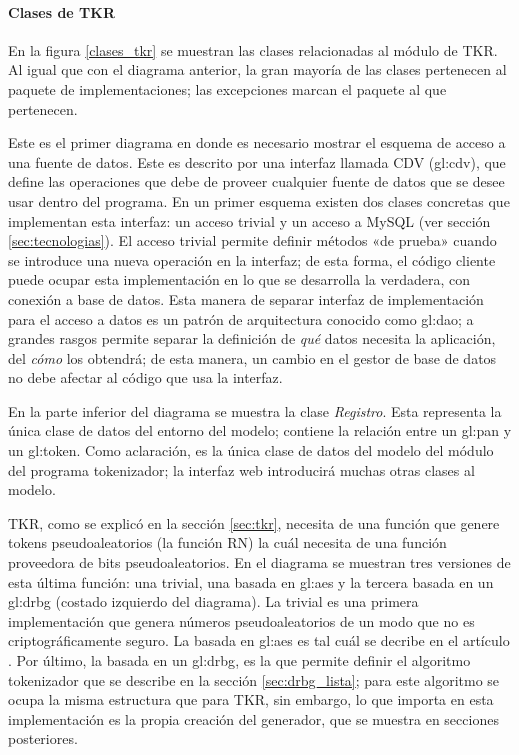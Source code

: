 %
%
%

\paragraph{Clases de TKR}
\label{sec:tkr_disenio}

En la figura \ref{clases_tkr} se muestran las clases relacionadas al módulo de
TKR. Al igual que con el diagrama anterior, la gran mayoría de las clases
pertenecen al paquete de implementaciones; las excepciones marcan el paquete al
que pertenecen.

Este es el primer diagrama en donde es necesario mostrar el esquema de acceso a
una fuente de datos. Este es descrito por una interfaz llamada CDV
(\acrlong{gl:cdv}), que define las operaciones que debe de proveer cualquier
fuente de datos que se desee usar dentro del programa. En un primer esquema
existen dos clases concretas que implementan esta interfaz: un acceso trivial y
un acceso a MySQL (ver sección \ref{sec:tecnologias}). El acceso trivial permite
definir métodos «de prueba» cuando se introduce una nueva operación en la
interfaz; de esta forma, el código cliente puede ocupar esta implementación en
lo que se desarrolla la verdadera, con conexión a base de datos. Esta manera de
separar interfaz de implementación para el acceso a datos es un patrón de
arquitectura conocido como \gls{gl:dao}; a grandes rasgos permite separar la
definición de \textit{qué} datos necesita la aplicación, del \textit{cómo} los
obtendrá; de esta manera, un cambio en el gestor de base de datos no debe
afectar al código que usa la interfaz.

En la parte inferior del diagrama se muestra la clase \textit{Registro}. Esta
representa la única clase de datos del entorno del modelo; contiene la relación
entre un \gls{gl:pan} y un \gls{gl:token}. Como aclaración, es la única clase de
datos del modelo del módulo del programa tokenizador; la interfaz web
introducirá muchas otras clases al modelo.

TKR, como se explicó en la sección \ref{sec:tkr}, necesita de una función que
genere tokens pseudoaleatorios (la función RN) la cuál necesita de una función
proveedora de bits pseudoaleatorios. En el diagrama se muestran tres versiones
de esta última función: una trivial, una basada en \gls{gl:aes} y la tercera
basada en un \gls{gl:drbg} (costado izquierdo del diagrama). La trivial es una
primera implementación que genera números pseudoaleatorios de un modo que no es
criptográficamente seguro. La basada en \gls{gl:aes} es tal cuál se decribe en
el artículo \cite{doc_sandra}. Por último, la basada en un \gls{gl:drbg},
es la que permite definir el algoritmo tokenizador que se describe en la sección
\ref{sec:drbg_lista}; para este algoritmo se ocupa la misma estructura que para
TKR, sin embargo, lo que importa en esta implementación es la propia creación
del generador, que se muestra en secciones posteriores.

